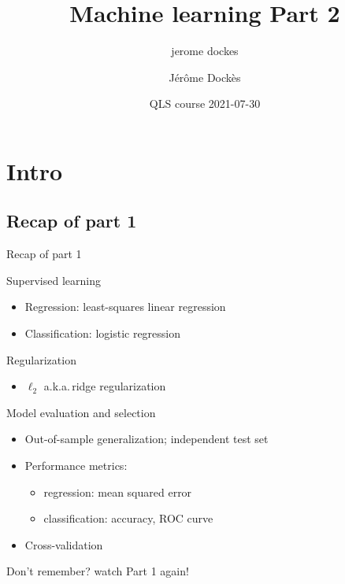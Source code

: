 \documentclass[presentation,mathserif,table]{beamer}
\author{jerome dockes}
\date{}
\title{Machine learning Part 2}
\author{Jérôme Dockès}
\date{QLS course 2021-07-30}
\newcommand{\aka}{a.k.a.\,}
\begin{document}
\maketitle
\section{Intro}
\label{sec:orgc1c9e80}
\subsection{Recap of part 1}
\label{sec:org6bab248}
\begin{frame}[label={sec:orgcda393d}]{Recap of part 1}
\begin{block}{Supervised learning}
\begin{itemize}
\item Regression: least-squares linear regression
\item Classification: logistic regression
\end{itemize}
\end{block}
\begin{block}{Regularization}
\begin{itemize}
\item \(\ell_2\) \aka ridge regularization
\end{itemize}
\end{block}
\begin{block}{Model evaluation and selection}
\begin{itemize}
\item Out-of-sample generalization; independent test set
\item Performance metrics:
\begin{itemize}
\item regression: mean squared error
\item classification: accuracy, ROC curve
\end{itemize}
\item Cross-validation
\end{itemize}
\end{block}
\begin{structureenv} %
Don't remember? watch Part 1 again!
\end{structureenv}
\end{frame}
\end{document}
